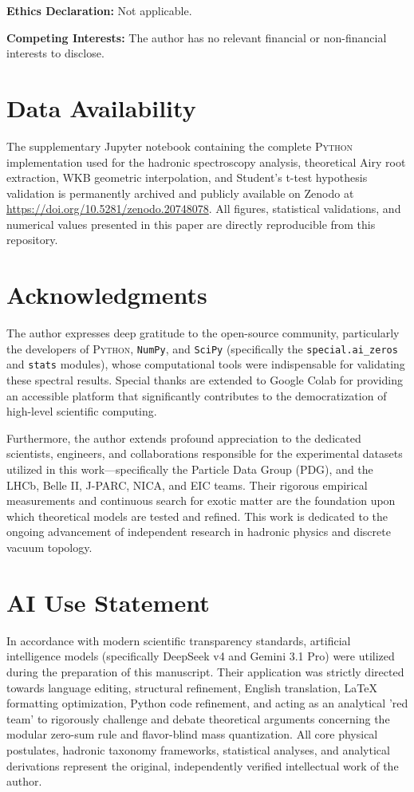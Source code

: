 \documentclass[12pt,a4paper]{article}
\theoremstyle{plain}
\theoremstyle{definition}
\theoremstyle{remark}
\begin{document}
\vspace{0.5em}
\noindent\textbf{Ethics Declaration:} Not applicable.

\vspace{0.5em}
\noindent\textbf{Competing Interests:} The author has no relevant financial or non-financial interests to disclose.

\section*{Data Availability}
The supplementary Jupyter notebook containing the complete \textsc{Python} implementation used for the hadronic spectroscopy analysis, theoretical Airy root extraction, WKB geometric interpolation, and Student's t-test hypothesis validation is permanently archived and publicly available on Zenodo at \url{https://doi.org/10.5281/zenodo.20748078}. All figures, statistical validations, and numerical values presented in this paper are directly reproducible from this repository.

\section*{Acknowledgments}
The author expresses deep gratitude to the open-source community, particularly the developers of \textsc{Python}, \texttt{NumPy}, and \texttt{SciPy} (specifically the \texttt{special.ai\_zeros} and \texttt{stats} modules), whose computational tools were indispensable for validating these spectral results. Special thanks are extended to Google Colab for providing an accessible platform that significantly contributes to the democratization of high-level scientific computing. 

Furthermore, the author extends profound appreciation to the dedicated scientists, engineers, and collaborations responsible for the experimental datasets utilized in this work---specifically the Particle Data Group (PDG), and the LHCb, Belle II, J-PARC, NICA, and EIC teams. Their rigorous empirical measurements and continuous search for exotic matter are the foundation upon which theoretical models are tested and refined. This work is dedicated to the ongoing advancement of independent research in hadronic physics and discrete vacuum topology.

\section*{AI Use Statement}
In accordance with modern scientific transparency standards, artificial intelligence models (specifically DeepSeek v4 and Gemini 3.1 Pro) were utilized during the preparation of this manuscript. Their application was strictly directed towards language editing, structural refinement, English translation, LaTeX formatting optimization, Python code refinement, and acting as an analytical 'red team' to rigorously challenge and debate theoretical arguments concerning the modular zero-sum rule and flavor-blind mass quantization. All core physical postulates, hadronic taxonomy frameworks, statistical analyses, and analytical derivations represent the original, independently verified intellectual work of the author.
\end{document}
